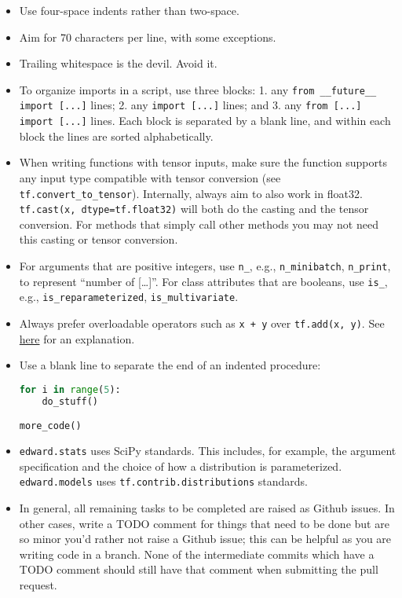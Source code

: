 \begin{itemize}
\item
  Use four-space indents rather than two-space.
\item
  Aim for 70 characters per line, with some exceptions.
\item
  Trailing whitespace is the devil. Avoid it.
\item
  To organize imports in a script, use three blocks: 1. any \texttt{from __future__
  import [...]} lines; 2. any \texttt{import [...]} lines; and 3. any
  \texttt{from [...] import [...]} lines. Each block is separated by a blank line,
  and within each block the lines are sorted alphabetically.
\item
  When writing functions with tensor inputs, make sure the function
  supports any input type compatible with tensor
  conversion (see \texttt{tf.convert_to_tensor}).
  Internally, always aim to also work in float32.
  \texttt{tf.cast(x, dtype=tf.float32)} will both do the casting and the
  tensor conversion. For methods that simply call other methods you
  may not need this casting or tensor conversion.
\item
  For arguments that are positive integers, use \texttt{n\_}, e.g.,
  \texttt{n\_minibatch}, \texttt{n\_print}, to represent ``number of
  {[}\ldots{}{]}''.  For class attributes that are booleans, use
  \texttt{is_}, e.g., \texttt{is_reparameterized},
  \texttt{is_multivariate}.
\item
  Always prefer overloadable operators such as \texttt{x + y} over
  \texttt{tf.add(x, y)}. See
  \href{http://stackoverflow.com/questions/37900780/in-tensorflow-what-is-the-difference-between-tf-add-and-operator}{here}
  for an explanation.
\item
  Use a blank line to separate the end of an indented procedure:
\begin{lstlisting}[language=Python]
for i in range(5):
    do_stuff()

more_code()
\end{lstlisting}
\item
  \texttt{edward.stats} uses SciPy standards. This
  includes, for example, the argument specification and the choice of
  how a distribution is parameterized. \texttt{edward.models}
  uses \texttt{tf.contrib.distributions} standards.
\item
  In general, all remaining tasks to be completed are raised as Github
  issues. In other cases, write a TODO comment for things that need to
  be done but are so minor you'd rather not raise a Github issue; this
  can be helpful as you are writing code in a branch. None of the
  intermediate commits which have a TODO comment should still have
  that comment when submitting the pull request.
\end{itemize}

